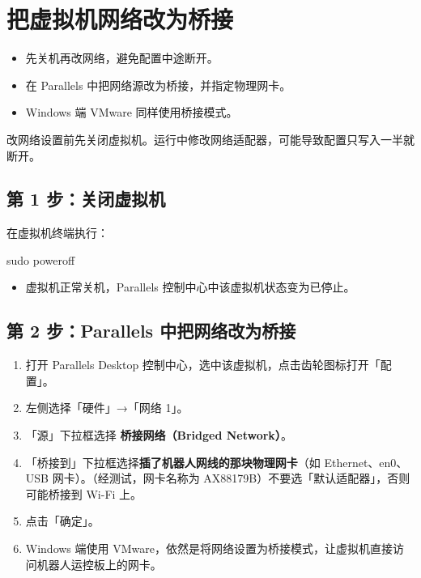 \chapter{把虚拟机网络改为桥接}
\label{chap:bridge}
\begin{intro}
\begin{itemize}
\item 先关机再改网络，避免配置中途断开。
\item 在 Parallels 中把网络源改为桥接，并指定物理网卡。
\item Windows 端 VMware 同样使用桥接模式。
\end{itemize}
\end{intro}
改网络设置前先关闭虚拟机。运行中修改网络适配器，可能导致配置只写入一半就断开。

\section{第 1 步：关闭虚拟机}
\label{step:1}
在虚拟机终端执行：

\begin{command}
sudo poweroff
\end{command}

\begin{expected}
\begin{itemize}
\item 虚拟机正常关机，Parallels 控制中心中该虚拟机状态变为已停止。
\end{itemize}
\end{expected}

\section{第 2 步：Parallels 中把网络改为桥接}
\label{step:2}
\begin{enumerate}
\item 打开 Parallels Desktop 控制中心，选中该虚拟机，点击齿轮图标打开「配置」。
\item 左侧选择「硬件」→「网络 1」。
\item 「源」下拉框选择 \textbf{桥接网络（Bridged Network）}。
\item 「桥接到」下拉框选择\textbf{插了机器人网线的那块物理网卡}（如 Ethernet、en0、USB 网卡）。（经测试，网卡名称为 AX88179B）不要选「默认适配器」，否则可能桥接到 Wi-Fi 上。
\item 点击「确定」。
\item Windows 端使用 VMware，依然是将网络设置为桥接模式，让虚拟机直接访问机器人运控板上的网卡。
\end{enumerate}

